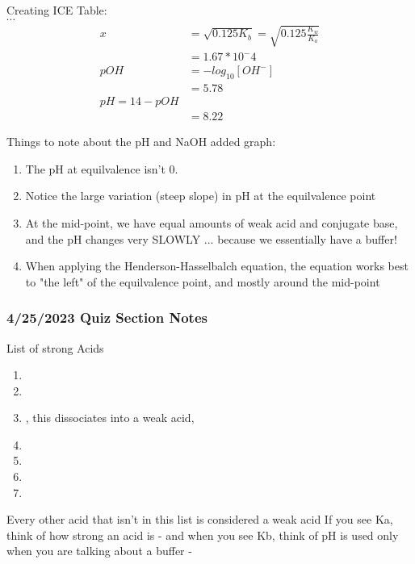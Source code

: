 \documentclass[../CHEM152Notes.tex]{subfiles}
\begin{document}
Creating ICE Table: \\

$\cdots$ %
\begin{equation*}
    \begin{aligned}
        x &= \sqrt{0.125 K_b} = \sqrt{0.125 \frac{K_w}{K_a}} \\
        &= 1.67*10^-4 \\
        pOH &= -log_{10}[OH^-] \\
        &= 5.78 \\
        pH = 14 - pOH \\
        &= 8.22 
    \end{aligned}
\end{equation*}

Things to note about the pH and NaOH added graph:
\begin{enumerate}
    \item The pH at equilvalence isn't 0.
    \item Notice the large variation (steep slope) in pH at the equilvalence point
    \item At the mid-point, we have equal amounts of weak acid and conjugate base, and the pH changes very SLOWLY ... because we essentially have a buffer!
    \item When applying the Henderson-Hasselbalch equation, the equation works best to "the left" of the equilvalence point, and mostly around the mid-point
\end{enumerate}

\subsubsection*{4/25/2023 Quiz Section Notes}

List of strong Acids
\begin{enumerate}
    \item {}
    \item {}
    \item {}, this dissociates into a weak acid, 
    \item {}
    \item {}
    \item {}
    \item {}
\end{enumerate}
Every other acid that isn't in this list is considered a weak acid
\newline
If you see Ka, think of how strong an acid is - and when you see Kb, think of 
\newline
pH is used only when you are talking about a buffer - 


\newpage
\end{document}
